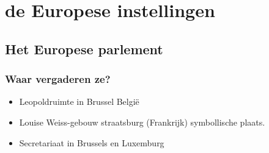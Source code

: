 \documentclass{article}
\begin{document}
    \section{de Europese instellingen}
    \subsection{Het Europese parlement}
    \subsubsection{Waar vergaderen ze?}
    \begin{itemize}
        \item Leopoldruimte in Brussel België
        \item Louise Weiss-gebouw straatsburg (Frankrijk) symbollische plaats.
        \item Secretariaat in Brussels en Luxemburg
    \end{itemize}
\end{document}
